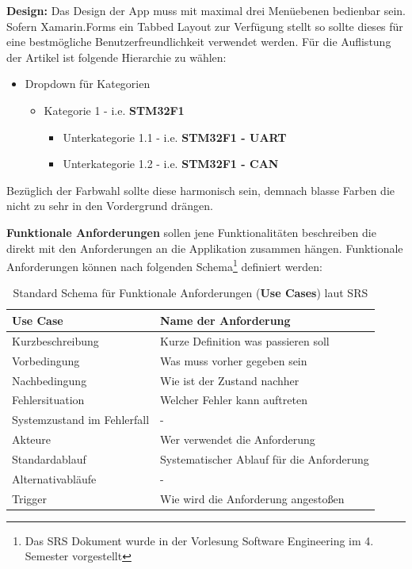 	\textbf{Design:} Das Design der App muss mit maximal drei Menüebenen bedienbar sein. Sofern Xamarin.Forms ein Tabbed Layout zur Verfügung stellt so sollte dieses für eine bestmögliche Benutzerfreundlichkeit verwendet werden. Für die Auflistung der Artikel ist folgende Hierarchie zu wählen:
	\begin{itemize}
		\setlength\itemsep{0em}
		\item Dropdown für Kategorien
		\begin{itemize}
			\setlength\itemsep{0em}
			\item Kategorie 1 - i.e. \textbf{STM32F1}
			\begin{itemize}
				\setlength\itemsep{0em}
				\item Unterkategorie 1.1 - i.e. \textbf{STM32F1 - UART}
				\item Unterkategorie 1.2 - i.e. \textbf{STM32F1 - CAN}
			\end{itemize}
		\end{itemize}
	\end{itemize}
	Bezüglich der Farbwahl sollte diese harmonisch sein, demnach blasse Farben die nicht zu sehr in den Vordergrund drängen.

	\textbf{Funktionale Anforderungen }sollen jene Funktionalitäten beschreiben die direkt mit den Anforderungen an die Applikation zusammen hängen. Funktionale Anforderungen können nach folgenden Schema\footnote{Das SRS Dokument wurde in der Vorlesung Software Engineering im 4. Semester vorgestellt} definiert werden:
	\begin{table}[h]
		\centering
		\begin{tabular}{ll}
			Use Case                    &  Name der Anforderung\\ \hline
			Kurzbeschreibung            &  Kurze Definition was passieren soll\\ \hline
			Vorbedingung                &  Was muss vorher gegeben sein\\ \hline
			Nachbedingung               &  Wie ist der Zustand nachher\\ \hline
			Fehlersituation             &  Welcher Fehler kann auftreten\\ \hline
			Systemzustand im Fehlerfall &  - \\ \hline
			Akteure                     &  Wer verwendet die Anforderung\\ \hline
			Standardablauf              &  Systematischer Ablauf für die Anforderung\\ \hline
			Alternativabläufe           &  - \\ \hline
			Trigger                     &  Wie wird die Anforderung angestoßen
		\end{tabular}
		\caption{Standard Schema für Funktionale Anforderungen (\textbf{Use Cases}) laut SRS}
		\label{my-label}
	\end{table}

